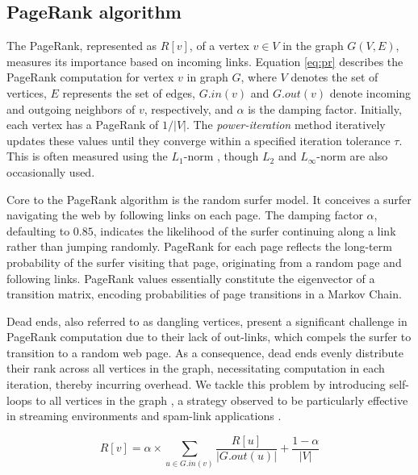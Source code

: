 \subsection{PageRank algorithm}
\label{sec:pagerank}

The PageRank, represented as $R[v]$, of a vertex $v \in V$ in the graph $G(V, E)$, measures its importance based on incoming links. Equation \ref{eq:pr} describes the PageRank computation for vertex $v$ in graph $G$, where $V$ denotes the set of vertices, $E$ represents the set of edges, $G.in(v)$ and $G.out(v)$ denote incoming and outgoing neighbors of $v$, respectively, and $\alpha$ is the damping factor. Initially, each vertex has a PageRank of $1/|V|$. The \textit{power-iteration} method iteratively updates these values until they converge within a specified iteration tolerance $\tau$. This is often measured using the $L_1$-norm \cite{ohsaka2015efficient}, though $L_2$ and $L_\infty$-norm are also occasionally used.

Core to the PageRank algorithm is the random surfer model. It conceives a surfer navigating the web by following links on each page. The damping factor $\alpha$, defaulting to $0.85$, indicates the likelihood of the surfer continuing along a link rather than jumping randomly. PageRank for each page reflects the long-term probability of the surfer visiting that page, originating from a random page and following links. PageRank values essentially constitute the eigenvector of a transition matrix, encoding probabilities of page transitions in a Markov Chain.

Dead ends, also referred to as dangling vertices, present a significant challenge in PageRank computation due to their lack of out-links, which compels the surfer to transition to a random web page. As a consequence, dead ends evenly distribute their rank across all vertices in the graph, necessitating computation in each iteration, thereby incurring overhead. We tackle this problem by introducing self-loops to all vertices in the graph \cite{kolda2009generalized, rank-andersen07, rank-langville06}, a strategy observed to be particularly effective in streaming environments and spam-link applications \cite{kolda2009generalized}.

\begin{equation}
\label{eq:pr}
    R[v] = \alpha \times \sum_{u \in G.in(v)} \frac{R[u]}{|G.out(u)|} + \frac{1 - \alpha}{|V|}
\end{equation}




